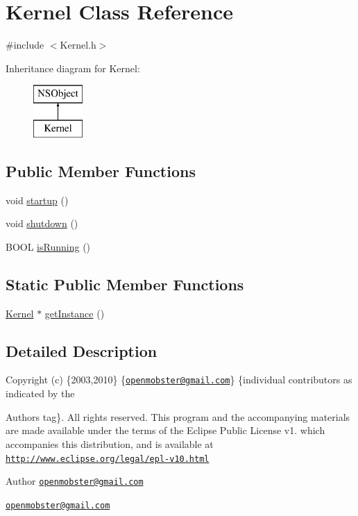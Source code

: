 \hypertarget{interface_kernel}{
\section{\-Kernel \-Class \-Reference}
\label{interface_kernel}
}


{\ttfamily \#include $<$\-Kernel.\-h$>$}

\-Inheritance diagram for \-Kernel\-:\begin{figure}[H]
\begin{center}
\leavevmode
\includegraphics[height=2.000000cm]{interface_kernel}
\end{center}
\end{figure}
\subsection*{\-Public \-Member \-Functions}
\begin{DoxyCompactItemize}
\item 
void \hyperlink{interface_kernel_a7c9e4e1acc2046837b1c7f7664ba8ffe}{startup} ()
\item 
void \hyperlink{interface_kernel_af706eadcad5a5e8c1c11879de8cbf01b}{shutdown} ()
\item 
\-B\-O\-O\-L \hyperlink{interface_kernel_afcd6f5c3029a1c5c7e52f36191fd48cc}{is\-Running} ()
\end{DoxyCompactItemize}
\subsection*{\-Static \-Public \-Member \-Functions}
\begin{DoxyCompactItemize}
\item 
\hyperlink{interface_kernel}{\-Kernel} $\ast$ \hyperlink{interface_kernel_a52170c319bada5d7ab2a918f01830cb7}{get\-Instance} ()
\end{DoxyCompactItemize}


\subsection{\-Detailed \-Description}
\-Copyright (c) \{2003,2010\} \{\href{mailto:openmobster@gmail.com}{\tt openmobster@gmail.\-com}\} \{individual contributors as indicated by the \begin{DoxyAuthor}{\-Authors}
tag\}. \-All rights reserved. \-This program and the accompanying materials are made available under the terms of the \-Eclipse \-Public \-License v1. which accompanies this distribution, and is available at \href{http://www.eclipse.org/legal/epl-v10.html}{\tt http\-://www.\-eclipse.\-org/legal/epl-\/v10.\-html}
\end{DoxyAuthor}
\begin{DoxyAuthor}{\-Author}
\href{mailto:openmobster@gmail.com}{\tt openmobster@gmail.\-com}

\href{mailto:openmobster@gmail.com}{\tt openmobster@gmail.\-com} 
\end{DoxyAuthor}


